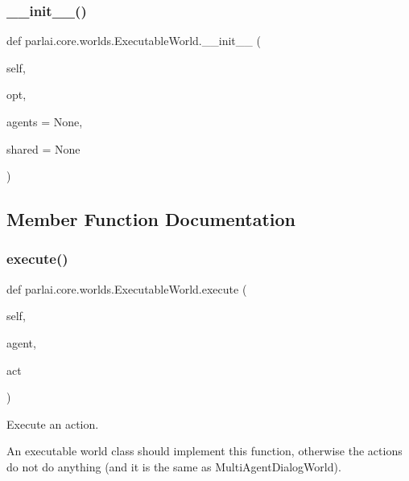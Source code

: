 \subsubsection{\texorpdfstring{\+\_\+\+\_\+init\+\_\+\+\_\+()}{\_\_init\_\_()}}
{\footnotesize\ttfamily def parlai.\+core.\+worlds.\+Executable\+World.\+\_\+\+\_\+init\+\_\+\+\_\+ (\begin{DoxyParamCaption}\item[{}]{self,  }\item[{}]{opt,  }\item[{}]{agents = {\ttfamily None},  }\item[{}]{shared = {\ttfamily None} }\end{DoxyParamCaption})}



\subsection{Member Function Documentation}
\mbox{\label{classparlai_1_1core_1_1worlds_1_1ExecutableWorld_a318fbf7c75178f62a6d46647f1a063fa}} 
\subsubsection{\texorpdfstring{execute()}{execute()}}
{\footnotesize\ttfamily def parlai.\+core.\+worlds.\+Executable\+World.\+execute (\begin{DoxyParamCaption}\item[{}]{self,  }\item[{}]{agent,  }\item[{}]{act }\end{DoxyParamCaption})}

\begin{DoxyVerb}Execute an action.

An executable world class should implement this function, otherwise the actions
do not do anything (and it is the same as MultiAgentDialogWorld).
\end{DoxyVerb}
 \mbox{\label{classparlai_1_1core_1_1worlds_1_1ExecutableWorld_a8bb31ec1d93a94cb261f89ce0992159a}} 

